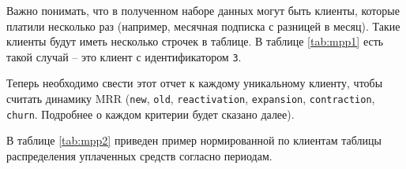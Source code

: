 Важно понимать, что в полученном наборе данных могут быть клиенты, которые платили несколько раз (например, месячная подписка с разницей в месяц). Такие клиенты будут иметь несколько строчек в таблице. В таблице \ref{tab:mpp1} есть такой случай -- это клиент с идентификатором \texttt{3}.

Теперь необходимо свести этот отчет к каждому уникальному клиенту, чтобы считать динамику MRR (\texttt{new}, \texttt{old}, \texttt{reactivation}, \texttt{expansion}, \texttt{contraction}, \texttt{churn}. Подробнее о каждом критерии будет сказано далее).

В таблице \ref{tab:mpp2} приведен пример нормированной по клиентам таблицы распределения уплаченных средств согласно периодам.

\begin{table}[H]
	\centering
	\caption{Нормированное распределение уплаченных средств согласно периодам}
	\label{tab:mpp2}
\end{table}
